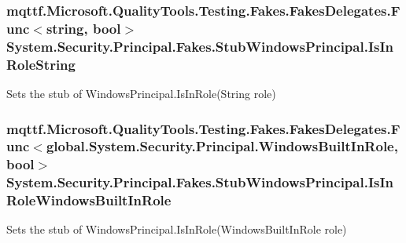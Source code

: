 \hypertarget{class_system_1_1_security_1_1_principal_1_1_fakes_1_1_stub_windows_principal_ab15c5724f12de5523645dc1a8ade8be6}{
\subsubsection[{Is\-In\-Role\-String}]{\setlength{\rightskip}{0pt plus 5cm}mqttf.\-Microsoft.\-Quality\-Tools.\-Testing.\-Fakes.\-Fakes\-Delegates.\-Func$<$string, bool$>$ System.\-Security.\-Principal.\-Fakes.\-Stub\-Windows\-Principal.\-Is\-In\-Role\-String}}\label{class_system_1_1_security_1_1_principal_1_1_fakes_1_1_stub_windows_principal_ab15c5724f12de5523645dc1a8ade8be6}


Sets the stub of Windows\-Principal.\-Is\-In\-Role(\-String role)

\hypertarget{class_system_1_1_security_1_1_principal_1_1_fakes_1_1_stub_windows_principal_add8188c541745a6065a9114addcc948c}{
\subsubsection[{Is\-In\-Role\-Windows\-Built\-In\-Role}]{\setlength{\rightskip}{0pt plus 5cm}mqttf.\-Microsoft.\-Quality\-Tools.\-Testing.\-Fakes.\-Fakes\-Delegates.\-Func$<$global.\-System.\-Security.\-Principal.\-Windows\-Built\-In\-Role, bool$>$ System.\-Security.\-Principal.\-Fakes.\-Stub\-Windows\-Principal.\-Is\-In\-Role\-Windows\-Built\-In\-Role}}\label{class_system_1_1_security_1_1_principal_1_1_fakes_1_1_stub_windows_principal_add8188c541745a6065a9114addcc948c}


Sets the stub of Windows\-Principal.\-Is\-In\-Role(\-Windows\-Built\-In\-Role role)

